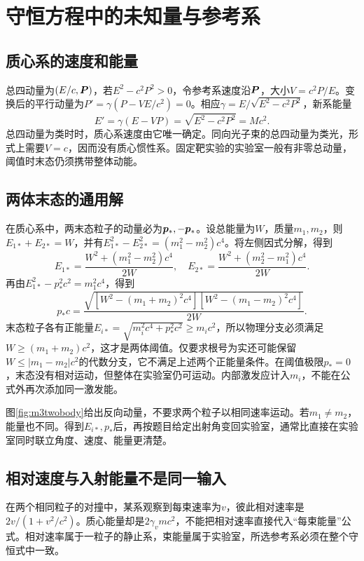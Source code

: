 \section{守恒方程中的未知量与参考系}
\subsection{质心系的速度和能量}
总四动量为$(E/c,\bm{P})$，若$E^2-c^2P^2>0$，令参考系速度沿$\bm{P}$，大小$V=c^2P/E$。变换后的平行动量为$P'=\gamma(P-VE/c^2)=0$。相应$\gamma=E/\sqrt{E^2-c^2P^2}$，新系能量
\[
 E'=\gamma(E-VP)=\sqrt{E^2-c^2P^2}=Mc^2.
\]
总四动量为类时时，质心系速度由它唯一确定。同向光子束的总四动量为类光，形式上需要$V=c$，因而没有质心惯性系。固定靶实验的实验室一般有非零总动量，阈值时末态仍须携带整体动能。

\subsection{两体末态的通用解}
在质心系中，两末态粒子的动量必为$\bm{p}_*,-\bm{p}_*$。设总能量为$W$，质量$m_1,m_2$，则$E_{1*}+E_{2*}=W$，并有$E_{1*}^2-E_{2*}^2=(m_1^2-m_2^2)c^4$。将左侧因式分解，得到
\[
 E_{1*}=\frac{W^2+(m_1^2-m_2^2)c^4}{2W},\quad
 E_{2*}=\frac{W^2+(m_2^2-m_1^2)c^4}{2W}.
\]
再由$E_{1*}^2-p_*^2c^2=m_1^2c^4$，得到
\[
 p_*c=\frac{\sqrt{[W^2-(m_1+m_2)^2c^4]
 [W^2-(m_1-m_2)^2c^4]}}{2W}.
\]
末态粒子各有正能量$E_{i*}=\sqrt{m_i^2c^4+p_*^2c^2}\geq m_ic^2$，所以物理分支必须满足$W\geq(m_1+m_2)c^2$，这才是两体阈值。仅要求根号为实还可能保留$W\leq|m_1-m_2|c^2$的代数分支，它不满足上述两个正能量条件。在阈值极限$p_*=0$，末态没有相对运动，但整体在实验室仍可运动。内部激发应计入$m_i$，不能在公式外再次添加同一激发能。

图\ref{fig:m3twobody}给出反向动量，不要求两个粒子以相同速率运动。若$m_1\ne m_2$，能量也不同。得到$E_{i*},p_*$后，再按题目给定出射角变回实验室，通常比直接在实验室同时联立角度、速度、能量更清楚。

\subsection{相对速度与入射能量不是同一输入}
在两个相同粒子的对撞中，某系观察到每束速率为$v$，彼此相对速率是$2v/(1+v^2/c^2)$。质心能量却是$2\gamma_vmc^2$，不能把相对速率直接代入“每束能量”公式。相对速率属于一粒子的静止系，束能量属于实验室，所选参考系必须在整个守恒式中一致。

